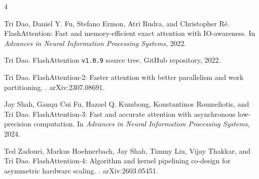 \documentclass{article}
\begin{document}
\clearpage

\begin{thebibliography}{4}

Tri Dao, Daniel Y. Fu, Stefano Ermon, Atri Rudra, and Christopher R{\'e}.
\newblock FlashAttention: Fast and memory-efficient exact attention with IO-awareness.
\newblock In \emph{Advances in Neural Information Processing Systems}, 2022.

Tri Dao.
\newblock FlashAttention \texttt{v1.0.9} source tree.
\newblock GitHub repository, 2022.

Tri Dao.
\newblock FlashAttention-2: Faster attention with better parallelism and work partitioning.
.
\newblock arXiv:2307.08691.

Jay Shah, Ganqu Cui Fu, Hazael Q. Kumbong, Konstantinos Roumeliotis, and Tri Dao.
\newblock FlashAttention-3: Fast and accurate attention with asynchronous low-precision computation.
\newblock In \emph{Advances in Neural Information Processing Systems}, 2024.

Ted Zadouri, Markus Hoehnerbach, Jay Shah, Timmy Liu, Vijay Thakkar, and Tri Dao.
\newblock FlashAttention-4: Algorithm and kernel pipelining co-design for asymmetric hardware scaling.
.
\newblock arXiv:2603.05451.

\end{thebibliography}
\end{document}
